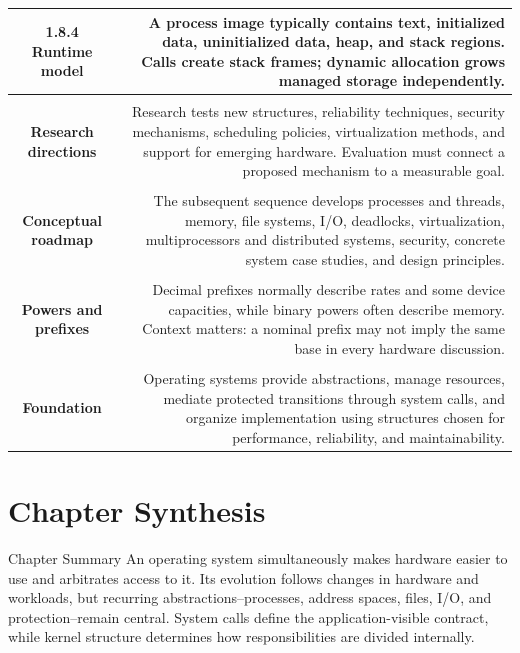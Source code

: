 \documentclass[10pt,letterpaper]{article}
\begin{document}
\begin{longtable}{C N}
\textbf{1.8.4 Runtime model} & A process image typically contains text, initialized data, uninitialized data, heap, and stack regions. Calls create stack frames; dynamic allocation grows managed storage independently.\\\hline
{}\\*\hline
\textbf{Research directions} & Research tests new structures, reliability techniques, security mechanisms, scheduling policies, virtualization methods, and support for emerging hardware. Evaluation must connect a proposed mechanism to a measurable goal.\\\hline
{}\\*\hline
\textbf{Conceptual roadmap} & The subsequent sequence develops processes and threads, memory, file systems, I/O, deadlocks, virtualization, multiprocessors and distributed systems, security, concrete system case studies, and design principles.\\\hline
{}\\*\hline
\textbf{Powers and prefixes} & Decimal prefixes normally describe rates and some device capacities, while binary powers often describe memory. Context matters: a nominal prefix may not imply the same base in every hardware discussion.\\\hline
{}\\*\hline
\textbf{Foundation} & Operating systems provide abstractions, manage resources, mediate protected transitions through system calls, and organize implementation using structures chosen for performance, reliability, and maintainability.\\\hline
\end{longtable}
\normalsize

\section*{Chapter Synthesis}
\begin{studybox}{Chapter Summary}
An operating system simultaneously makes hardware easier to use and arbitrates access to it. Its evolution follows changes in hardware and workloads, but recurring abstractions--processes, address spaces, files, I/O, and protection--remain central. System calls define the application-visible contract, while kernel structure determines how responsibilities are divided internally.
\end{studybox}
\end{document}
